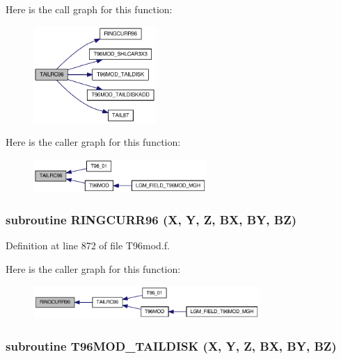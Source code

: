 Here is the call graph for this function:\nopagebreak
\begin{figure}[H]
\begin{center}
\leavevmode
\includegraphics[width=132pt]{_t96mod_8f_a2c7e086277c827ff05f4a9c6eb99b2b_cgraph}
\end{center}
\end{figure}


Here is the caller graph for this function:\nopagebreak
\begin{figure}[H]
\begin{center}
\leavevmode
\includegraphics[width=187pt]{_t96mod_8f_a2c7e086277c827ff05f4a9c6eb99b2b_icgraph}
\end{center}
\end{figure}
\hypertarget{_t96mod_8f_87fae8404610c1e792fff8db728b60a3}{
\subsubsection[{RINGCURR96}]{\setlength{\rightskip}{0pt plus 5cm}subroutine RINGCURR96 (X, \/  Y, \/  Z, \/  BX, \/  BY, \/  BZ)}}
\label{_t96mod_8f_87fae8404610c1e792fff8db728b60a3}




Definition at line 872 of file T96mod.f.

Here is the caller graph for this function:\nopagebreak
\begin{figure}[H]
\begin{center}
\leavevmode
\includegraphics[width=244pt]{_t96mod_8f_87fae8404610c1e792fff8db728b60a3_icgraph}
\end{center}
\end{figure}
\hypertarget{_t96mod_8f_b0a52ce0e8651f818014bb9cd0040927}{
\subsubsection[{T96MOD\_\-TAILDISK}]{\setlength{\rightskip}{0pt plus 5cm}subroutine T96MOD\_\-TAILDISK (X, \/  Y, \/  Z, \/  BX, \/  BY, \/  BZ)}}
\label{_t96mod_8f_b0a52ce0e8651f818014bb9cd0040927}




